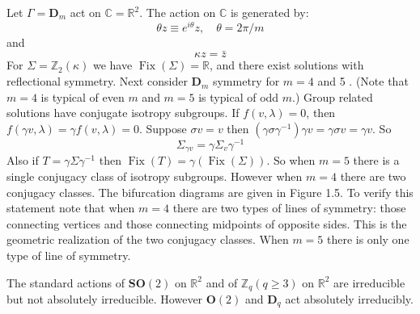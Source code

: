 \documentclass{scrartcl}
\begin{document}
    \begin{example}\label{notes_normal_forms:ex:1.34}
      Let \(\Gamma=\mathbf{D}_{m}\) act on \(\mathbb{C}=\mathbb{R}^{2}\).
      The action on \(\mathbb{C}\) is generated by:
      \begin{equation*}
        \theta z \equiv e^{i \theta} z, \quad \theta = 2 \pi / m
      \end{equation*}
      and
      \begin{equation*}
        \kappa z=\bar{z}
      \end{equation*}
      For \(\Sigma=\mathbb{Z}_{2}(\kappa)\) we have \(\operatorname{Fix}(\Sigma)=\mathbb{R}\), and there exist solutions with reflectional symmetry.
      Next consider \(\mathbf{D}_{m}\) symmetry for \(m = 4\) and 5 .
      (Note that \(m = 4\) is typical of even \(m\) and \(m = 5\) is typical of odd \(m\).)
      Group related solutions have conjugate isotropy subgroups.
      If \(f(v, \lambda)=0\), then \(f(\gamma v, \lambda)=\gamma f(v, \lambda)=0\).
      Suppose \(\sigma v = v\) then \(\left(\gamma \sigma \gamma^{-1}\right) \gamma v=\gamma \sigma v=\gamma v\).
      So
      \begin{equation*}
        \Sigma_{\gamma v}=\gamma \Sigma_{v} \gamma^{-1}
      \end{equation*}
      Also if \(T=\gamma \Sigma \gamma^{-1}\) then \(\operatorname{Fix}(T)=\gamma(\operatorname{Fix}(\Sigma))\).
      So when \(m = 5\) there is a single conjugacy class of isotropy subgroups.
      However when \(m = 4\) there are two conjugacy classes.
      The bifurcation diagrams are given in Figure 1.5.
      To verify this statement note that when \(m = 4\) there are two types of lines of symmetry: those connecting vertices and those connecting midpoints of opposite sides.
      This is the geometric realization of the two conjugacy classes.
      When \(m = 5\) there is only one type of line of symmetry.
    \end{example}
    \begin{example}\label{notes_normal_forms:ex:4.4}
      The standard actions of \(\mathbf{S O}(2)\) on \(\mathbb{R}^{2}\) and of \(\mathbb{Z}_{q}(q \geq 3)\) on \(\mathbb{R}^{2}\) are irreducible but not absolutely irreducible.
      However \(\mathbf{O}(2)\) and \(\mathbf{D}_{q}\) act absolutely irreducibly.
    \end{example}
\end{document}
